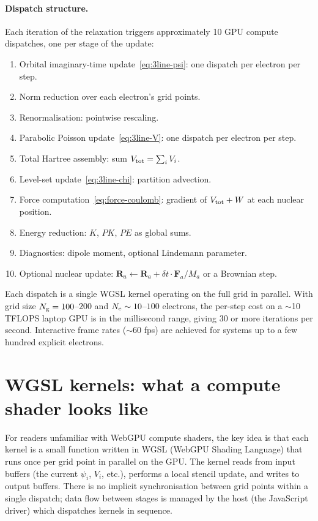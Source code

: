 \paragraph{Dispatch structure.} Each iteration of the relaxation triggers approximately 10 GPU compute dispatches, one per stage of the update:
\begin{enumerate}
\item Orbital imaginary-time update~\eqref{eq:3line-psi}: one dispatch per electron per step.
\item Norm reduction over each electron's grid points.
\item Renormalisation: pointwise rescaling.
\item Parabolic Poisson update~\eqref{eq:3line-V}: one dispatch per electron per step.
\item Total Hartree assembly: sum $V_{\rm tot} = \sum_i V_i$.
\item Level-set update~\eqref{eq:3line-chi}: partition advection.
\item Force computation~\eqref{eq:force-coulomb}: gradient of $V_{\rm tot} + W$ at each nuclear position.
\item Energy reduction: $K$, $PK$, $PE$ as global sums.
\item Diagnostics: dipole moment, optional Lindemann parameter.
\item Optional nuclear update: $\mathbf{R}_a \leftarrow \mathbf{R}_a + \delta t \cdot \mathbf{F}_a / M_a$ or a Brownian step.
\end{enumerate}
Each dispatch is a single WGSL kernel operating on the full grid in parallel. With grid size $N_{\rm g} = 100$--$200$ and $N_{\rm e} \sim 10$--$100$ electrons, the per-step cost on a $\sim$10 TFLOPS laptop GPU is in the millisecond range, giving 30 or more iterations per second. Interactive frame rates ($\sim$60 fps) are achieved for systems up to a few hundred explicit electrons.

\section{WGSL kernels: what a compute shader looks like}\label{sec:wgsl}

For readers unfamiliar with WebGPU compute shaders, the key idea is that each kernel is a small function written in WGSL (WebGPU Shading Language) that runs once per grid point in parallel on the GPU. The kernel reads from input buffers (the current $\psi_i$, $V_i$, etc.), performs a local stencil update, and writes to output buffers. There is no implicit synchronisation between grid points within a single dispatch; data flow between stages is managed by the host (the JavaScript driver) which dispatches kernels in sequence.

